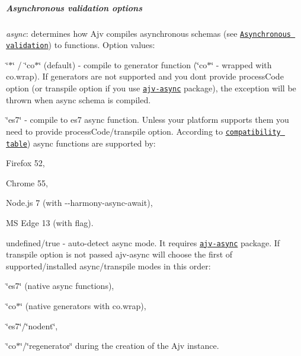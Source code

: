 \subparagraph*{Asynchronous validation options}


\begin{DoxyItemize}
\item {\itshape async}\+: determines how Ajv compiles asynchronous schemas (see \href{#asynchronous-validation}{\tt Asynchronous validation}) to functions. Option values\+:
\begin{DoxyItemize}
\item {\ttfamily \char`\"{}$\ast$\char`\"{}} / {\ttfamily \char`\"{}co$\ast$\char`\"{}} (default) -\/ compile to generator function (\char`\"{}co$\ast$\char`\"{} -\/ wrapped with {\ttfamily co.\+wrap}). If generators are not supported and you don\textquotesingle{}t provide {\ttfamily process\+Code} option (or {\ttfamily transpile} option if you use \href{https://github.com/epoberezkin/ajv-async}{\tt ajv-\/async} package), the exception will be thrown when async schema is compiled.
\item {\ttfamily \char`\"{}es7\char`\"{}} -\/ compile to es7 async function. Unless your platform supports them you need to provide {\ttfamily process\+Code}/{\ttfamily transpile} option. According to \href{http://kangax.github.io/compat-table/es7/}{\tt compatibility table}) async functions are supported by\+:
\begin{DoxyItemize}
\item Firefox 52,
\item Chrome 55,
\item Node.\+js 7 (with {\ttfamily -\/-\/harmony-\/async-\/await}),
\item MS Edge 13 (with flag).
\end{DoxyItemize}
\item {\ttfamily undefined}/{\ttfamily true} -\/ auto-\/detect async mode. It requires \href{https://github.com/epoberezkin/ajv-async}{\tt ajv-\/async} package. If transpile option is not passed ajv-\/async will choose the first of supported/installed async/transpile modes in this order\+:
\begin{DoxyItemize}
\item \char`\"{}es7\char`\"{} (native async functions),
\item \char`\"{}co$\ast$\char`\"{} (native generators with co.\+wrap),
\item \char`\"{}es7\char`\"{}/\char`\"{}nodent\char`\"{},
\item \char`\"{}co$\ast$\char`\"{}/\char`\"{}regenerator\char`\"{} during the creation of the Ajv instance.
\end{DoxyItemize}
\end{DoxyItemize}


\end{DoxyItemize}
